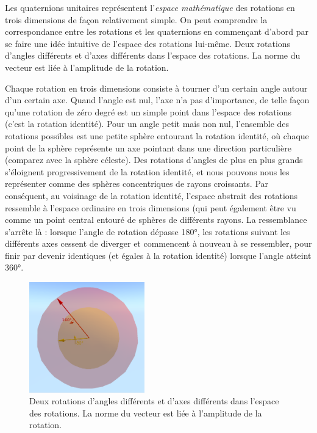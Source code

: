Les quaternions unitaires représentent l'\emph{espace mathématique} des rotations en trois dimensions de façon relativement simple. On peut comprendre la correspondance entre les rotations et les quaternions en commençant d'abord par se faire une idée intuitive de l'espace des rotations lui-même.
Deux rotations d'angles différents et d'axes différents dans l'espace des rotations. La norme du vecteur est liée à l'amplitude de la rotation.

Chaque rotation en trois dimensions consiste à tourner d'un certain angle autour d'un certain axe. Quand l'angle est nul, l'axe n'a pas d'importance, de telle façon qu'une rotation de zéro degré est un simple point dans l'espace des rotations (c'est la rotation identité). Pour un angle petit mais non nul, l'ensemble des rotations possibles est une petite sphère entourant la rotation identité, où chaque point de la sphère représente un axe pointant dans une direction particulière (comparez avec la sphère céleste). Des rotations d'angles de plus en plus grands s'éloignent progressivement de la rotation identité, et nous pouvons nous les représenter comme des sphères concentriques de rayons croissants. Par conséquent, au voisinage de la rotation identité, l'espace abstrait des rotations ressemble à l'espace ordinaire en trois dimensions (qui peut également être vu comme un point central entouré de sphères de différents rayons. La ressemblance s'arrête là : lorsque l'angle de rotation dépasse \ang{180}, les rotations suivant les différents axes cessent de diverger et commencent à nouveau à se ressembler, pour finir par devenir identiques (et égales à la rotation identité) lorsque l'angle atteint \ang{360}.

\begin{figure}[ht]
	\centering
	\includegraphics[width=5cm]{ressources/espace_rotations}\hfill
	\caption{Deux rotations d'angles différents et d'axes différents dans l'espace des rotations. La norme du vecteur est liée à l'amplitude de la rotation.}
	\label{espace_rotations}
\end{figure}

